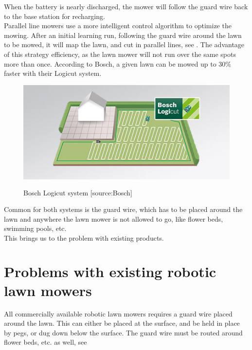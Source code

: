 \noindent
When the battery is nearly discharged, the mower will follow the guard wire back to the base station for recharging.\\

\noindent
Parallel line mowers use a more intelligent control algorithm to optimize the mowing. After an initial learning run, following the guard wire around the lawn to be mowed, it will map the lawn, and cut in parallel lines, see . The advantage of this strategy efficiency, as the lawn mower will not run over the same spots more than once. According to Bosch, a given lawn can be mowed up to 30\% faster with their Logicut system.
 

\begin{figure}[H]
\centering
\includegraphics[scale=0.8]{figures/logicut.jpg} 
\label{fig:logicut}
\caption{Bosch Logicut system [source:Bosch]} 
\end{figure}

\noindent
Common for both systems is the guard wire, which has to be placed around the lawn and anywhere the lawn mower is not allowed to go, like flower beds, swimming pools, etc. \\

\noindent
This brings us to the problem with existing products.

\section{Problems with existing robotic lawn mowers}
All commercially available robotic lawn mowers requires a guard wire placed around the lawn. This can either be placed at the surface, and be held in place by pegs, or dug down below the surface. The guard wire must be routed around flower beds, etc. as well, see 

